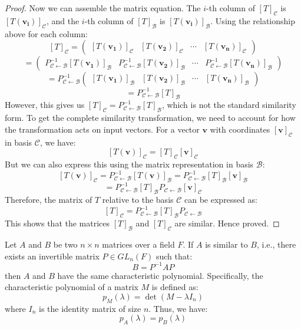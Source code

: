 \documentclass[openany]{book}
\begin{document}
\begin{proof}
    Now we can assemble the matrix equation. The $i$-th column of $[T]_{\mathcal{C}}$ is $[T(\mathbf{v_i})]_{\mathcal{C}}$, and the $i$-th column of $[T]_{\mathcal{B}}$ is $[T(\mathbf{v_i})]_{\mathcal{B}}$. Using the relationship above for each column:
    \[[T]_{\mathcal{C}} = \begin{pmatrix}[T(\mathbf{v_1})]_{\mathcal{C}} & [T(\mathbf{v_2})]_{\mathcal{C}} & \cdots & [T(\mathbf{v_n})]_{\mathcal{C}}\end{pmatrix}\]
    \[= \begin{pmatrix}P_{\mathcal{C} \leftarrow \mathcal{B}}^{-1} [T(\mathbf{v_1})]_{\mathcal{B}} & P_{\mathcal{C} \leftarrow \mathcal{B}}^{-1} [T(\mathbf{v_2})]_{\mathcal{B}} & \cdots & P_{\mathcal{C} \leftarrow \mathcal{B}}^{-1} [T(\mathbf{v_n})]_{\mathcal{B}}\end{pmatrix}\]
    \[= P_{\mathcal{C} \leftarrow \mathcal{B}}^{-1} \begin{pmatrix}[T(\mathbf{v_1})]_{\mathcal{B}} & [T(\mathbf{v_2})]_{\mathcal{B}} & \cdots & [T(\mathbf{v_n})]_{\mathcal{B}}\end{pmatrix}\]
    \[= P_{\mathcal{C} \leftarrow \mathcal{B}}^{-1} [T]_{\mathcal{B}}\]
    However, this gives us $[T]_{\mathcal{C}} = P_{\mathcal{C} \leftarrow \mathcal{B}}^{-1} [T]_{\mathcal{B}}$, which is not the standard similarity form. To get the complete similarity transformation, we need to account for how the transformation acts on input vectors. For a vector $\mathbf{v}$ with coordinates $[\mathbf{v}]_{\mathcal{C}}$ in basis $\mathcal{C}$, we have:
    \[[T(\mathbf{v})]_{\mathcal{C}} = [T]_{\mathcal{C}} [\mathbf{v}]_{\mathcal{C}}\]
    But we can also express this using the matrix representation in basis $\mathcal{B}$:
    \[[T(\mathbf{v})]_{\mathcal{C}} = P_{\mathcal{C} \leftarrow \mathcal{B}}^{-1} [T(\mathbf{v})]_{\mathcal{B}} = P_{\mathcal{C} \leftarrow \mathcal{B}}^{-1} [T]_{\mathcal{B}} [\mathbf{v}]_{\mathcal{B}}\]
    \[= P_{\mathcal{C} \leftarrow \mathcal{B}}^{-1} [T]_{\mathcal{B}} P_{\mathcal{C} \leftarrow \mathcal{B}} [\mathbf{v}]_{\mathcal{C}}\]
    Therefore, the matrix of $T$ relative to the basis $\mathcal{C}$ can be expressed as:
    \[[T]_{\mathcal{C}} = P_{\mathcal{C} \leftarrow \mathcal{B}}^{-1} [T]_{\mathcal{B}} P_{\mathcal{C} \leftarrow \mathcal{B}}\]
    This shows that the matrices $[T]_{\mathcal{B}}$ and $[T]_{\mathcal{C}}$ are similar. Hence proved.
\end{proof}
\begin{mytheorem}
    Let $A$ and $B$ be two $n \times n$ matrices over a field $F$. If $A$ is similar to $B$, i.e., there exists an invertible matrix $P \in GL_n(F)$ such that:
    $$B = P^{-1}AP$$
    then $A$ and $B$ have the same characteristic polynomial. Specifically, the characteristic polynomial of a matrix $M$ is defined as:
    $$p_M(\lambda) = \det(M - \lambda I_n)$$
    where $I_n$ is the identity matrix of size $n$. Thus, we have:
    $$p_A(\lambda) = p_B(\lambda)$$
\end{mytheorem}
\end{document}

